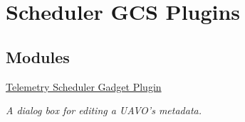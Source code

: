 \hypertarget{group___telemetry}{\section{\-Scheduler \-G\-C\-S \-Plugins}
\label{group___telemetry}
}
\subsection*{\-Modules}
\begin{DoxyCompactItemize}
\item 
\hyperlink{group___telemetry_scheduler_gadget_plugin}{\-Telemetry Scheduler Gadget Plugin}
\begin{DoxyCompactList}\small\item\em \-A dialog box for editing a \-U\-A\-V\-O's metadata. \end{DoxyCompactList}\end{DoxyCompactItemize}
